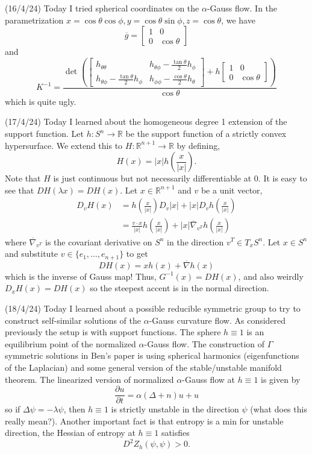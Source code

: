 \documentclass[12pt,a4paper]{article}
\newcommand{\R}{\mathbb{R}}
\begin{document}
(16/4/24) Today I tried spherical coordinates on the $ \alpha $-Gauss flow. In the parametrization $ x = \cos \theta \cos \phi, y = \cos \theta \sin \phi, z = \cos \theta $, we have 
\[ \overline{g} = \begin{bmatrix}
    1 & 0 \\
    0 & \cos \theta
\end{bmatrix} \]
 and 
 \[ K^{-1} = \frac{\det \left(\begin{bmatrix}
    h_{\theta \theta} & h_{\theta \phi} - \frac{\tan \theta}{2}h_{\phi} \\
    h_{\theta \phi} - \frac{\tan \theta}{2}h_{\phi} & h_{\phi \phi} - \frac{\cos \theta}{2}h_{\theta}
 \end{bmatrix}
     + h\begin{bmatrix}
        1 & 0 \\
    0 & \cos \theta
     \end{bmatrix}\right)}{\cos \theta}\]
which is quite ugly.

(17/4/24) Today I learned about the homogeneous degree 1 extension of the support function. Let $ h : S^{n} \to \R$ be the support function of a strictly convex hypersurface. We extend this to $ H : \R^{n+1} \to \R $ by defining, 
\[ H(x) = |x| h\left( \frac{x}{|x|}\right).\]
Note that $ H $ is just continuous but not necessarily differentiable at $ 0 $. It is easy to see that $ DH(\lambda x) = DH(x) $. Let $ x \in \R^{n+1} $ and $ v $ be a unit vector, \begin{align*}
    D_{v}H(x) &= h\left( \frac{x}{|x|}\right)D_{v}|x| +|x|D_{v}h\left(\frac{x}{|x|}\right) \\
    & = \frac{v \cdot x}{|x|}h\left( \frac{x}{|x|}\right) + |x|\overline{\nabla}_{v^{T}}h\left( \frac{x}{|x|}\right)
\end{align*}
where $ \overline{\nabla}_{v^{T}} $ is the covariant derivative on $ S^{n} $ in the direction $ v^{T} \in T_{x}S^{n} $. Let $ x \in S^{n} $ and substitute $ v \in \{e_{1}, \dots, e_{n+1}\} $ to get
\[ DH(x) = xh(x)+\overline{\nabla}h(x) \]
which is the inverse of Gauss map! %
Thus, $ G^{-1}(x) = DH(x) $, and also weirdly $ D_{x}H(x) = DH(x) $ so the steepest accent is in the normal direction.

(18/4/24) Today I learned about a possible reducible symmetric group to try to construct self-similar solutions of the $ \alpha $-Gauss curvature flow. As considered previously the setup is with support functions. The sphere $ h \equiv 1 $ is an equilibrium point of the normalized $ \alpha $-Gauss flow. The construction of $ \Gamma $ symmetric solutions in Ben's paper is using spherical harmonics (eigenfunctions of the Laplacian) and some general version of the stable/unstable manifold theorem. The linearized version of normalized $ \alpha $-Gauss flow at $ h \equiv 1 $ is given by 
\[ \frac{\partial u}{\partial t} = \alpha( \Delta + n)u+u \]
so if $ \Delta \psi = - \lambda \psi $, then $ h \equiv 1 $ is strictly unstable in the direction $ \psi $ (what does this really mean?). Another important fact is that entropy is a min for unstable direction, the Hessian of entropy at $ h \equiv 1 $ satisfies 
\[ D^{2}Z_{h}(\psi, \psi) > 0. \]
\end{document}
